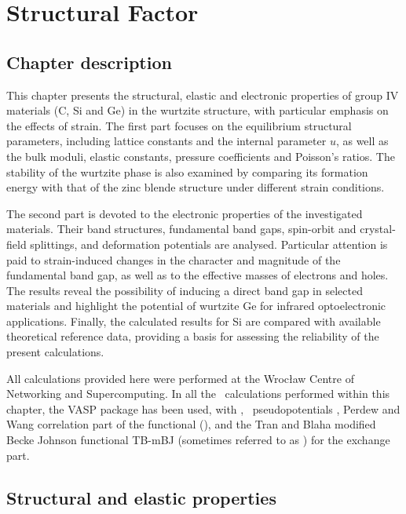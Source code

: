 \chapter{Structural Factor}
\label{chap:wurtzite}

\section*{Chapter description}

This chapter presents the structural, elastic and electronic properties of group IV materials (C, Si and Ge) in the wurtzite structure, with particular emphasis on the effects of strain. The first part focuses on the equilibrium structural parameters, including lattice constants and the internal parameter \(u\), as well as the bulk moduli, elastic constants, pressure coefficients and Poisson's ratios. The stability of the wurtzite phase is also examined by comparing its formation energy with that of the zinc blende structure under different strain conditions.


The second part is devoted to the electronic properties of the investigated materials. Their band structures, fundamental band gaps, spin-orbit and crystal-field splittings, and deformation potentials are analysed. Particular attention is paid to strain-induced changes in the character and magnitude of the fundamental band gap, as well as to the effective masses of electrons and holes. The results reveal the possibility of inducing a direct band gap in selected materials and highlight the potential of wurtzite Ge for infrared optoelectronic applications. Finally, the calculated results for Si are compared with available theoretical reference data, providing a basis for assessing the reliability of the present calculations.


All calculations provided here were performed at the Wrocław Centre of Networking and Supercomputing.
In all the \abinitio\ calculations performed within this chapter, the VASP package \cite{vasp1} has been used, with \LDA, \PAW\ pseudopotentials \cite{vasp2, paw}, Perdew and Wang correlation part of the functional \cite{pw} (\PAW), and the Tran and Blaha modified Becke Johnson functional TB-mBJ (sometimes referred to as \mBJLDA) \cite{tbtb} for the exchange part.
\ornament

\section{Structural and elastic properties}

